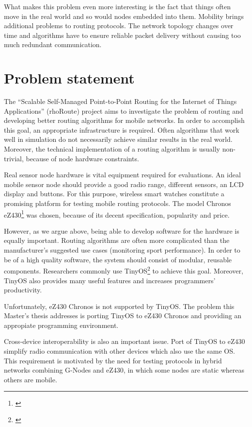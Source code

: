 What makes this problem even more interesting is the fact that things often move in the real world and so would nodes embedded into them.
Mobility brings additional problems to routing protocols.
The network topology changes over time and algorithms have to ensure reliable packet delivery without causing too much redundant communication.


\section{Problem statement}
The ``Scalable Self-Managed Point-to-Point Routing for the Internet of Things Applications'' (rhoRoute) project aims to investigate the problem of routing and developing better routing algorithms for mobile networks.
In order to accomplish this goal, an appropriate infrastructure is required.
Often algorithms that work well in simulation do not necessarily achieve similar results in the real world.
Moreover, the technical implementation of a routing algorithm is usually non-trivial, because of node hardware constraints.

Real sensor node hardware is vital equipment required for evaluations.
An ideal mobile sensor node should provide a good radio range, different sensors, an LCD display and buttons.
For this purpose, wireless smart watches constitute a promising platform for testing mobile routing protocols.
The model Chronos eZ430\footnote{\cite{eZ430Chronos}} was chosen, because of its decent specification, popularity and price.

However, as we argue above, being able to develop software for the hardware is equally important.
Routing algorithms are often more complicated than the manufacturer's suggested use cases (monitoring sport performance). 
In order to be of a high quality software, the system should consist of modular, reusable components.
Researchers commonly use TinyOS\footnote{\cite{TinyOS}} to achieve this goal.
Moreover, TinyOS also provides many useful features and increases programmers' productivity.

Unfortunately, eZ430 Chronos is not supported by TinyOS.
The problem this Master's thesis addresses is porting TinyOS to eZ430 Chronos and providing an appropiate programming environment. 

Cross-device interoperability is also an important issue.
Port of TinyOS to eZ430 simplify radio communication with other devices which also use the same OS.
This requirement is motivated by the need for testing protocols in hybrid networks combining G-Nodes and eZ430, in which some nodes are static whereas others are mobile.

